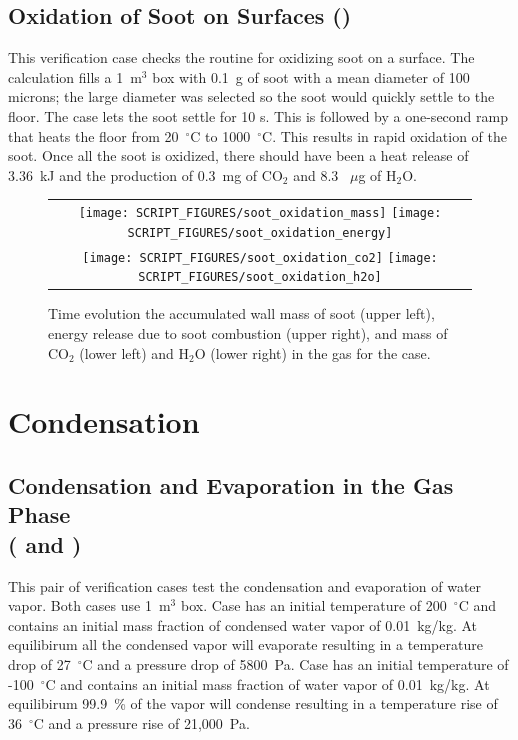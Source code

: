 \documentclass[11pt]{book}
\begin{document}
\subsection{Oxidation of Soot on Surfaces (\texorpdfstring{}{soot\_oxidation\_wall})}
\label{soot_oxidation_wall}

This verification case checks the routine for oxidizing soot on a surface. The calculation fills a 1~m$^3$ box with 0.1~g of soot with a mean diameter of 100 microns; the large diameter was selected so the soot would quickly settle to the floor. The case lets the soot settle for 10 s. This is followed by a one-second ramp that heats the floor from 20~$^\circ$C to 1000~$^\circ$C. This results in rapid oxidation of the soot. Once all the soot is oxidized, there should have been a heat release of  3.36~kJ and the production of 0.3~mg of CO$_2$ and 8.3 ~$\mu$g of H$_2$O.

\begin{figure}[ht]
	\centering
	\begin{tabular}{c}
		\texttt{[image: SCRIPT\_FIGURES/soot\_oxidation\_mass]}
		\texttt{[image: SCRIPT\_FIGURES/soot\_oxidation\_energy]} \\
		\texttt{[image: SCRIPT\_FIGURES/soot\_oxidation\_co2]}
		\texttt{[image: SCRIPT\_FIGURES/soot\_oxidation\_h2o]}
	\end{tabular}
	\caption[Results of the  case]{Time evolution the accumulated wall mass of soot (upper left), energy release due to soot combustion (upper right), and mass of CO$_2$ (lower left) and H$_2$O (lower right) in the gas for the  case.}
	\label{fig:soot_oxidation}
\end{figure}

\section{Condensation}
\subsection{Condensation and Evaporation in the Gas Phase\\(\texorpdfstring{ and }{condensation\_1 and condensation\_2})}
	\label{condensation_evaporation}
This pair of verification cases test the condensation and evaporation of water vapor. Both cases use 1~m$^3$ box. Case  has an initial temperature of 200~$^\circ$C and contains an initial mass fraction of condensed water vapor of 0.01~kg/kg. At equilibirum all the condensed vapor will evaporate resulting in a temperature drop of 27~$^\circ$C and a pressure drop of 5800~Pa. Case  has an initial temperature of -100~$^\circ$C and contains an initial mass fraction of water vapor of 0.01~kg/kg. At equilibirum 99.9~\% of the vapor will condense resulting in a temperature rise of 36~$^\circ$C and a pressure rise of 21,000~Pa.
\end{document}
